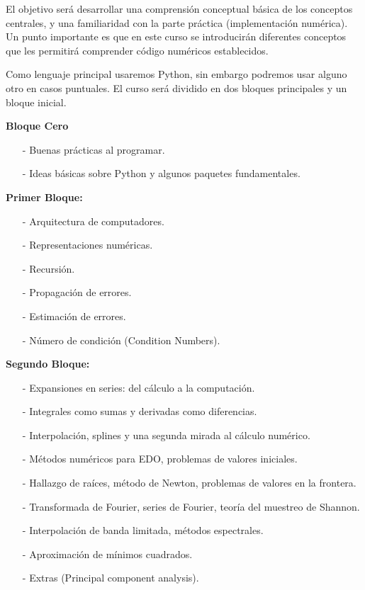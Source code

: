 \documentclass[12pt]{amsart} %
\begin{document}
\vspace{8pt}

El objetivo será desarrollar una comprensión conceptual básica de los conceptos centrales, y una familiaridad con la parte práctica (implementación numérica). Un punto importante es que en este curso se introducirán diferentes conceptos que les permitirá comprender código numéricos establecidos.

\vspace{8pt}
Como lenguaje principal usaremos Python, sin embargo podremos usar alguno otro en casos puntuales. El curso será dividido en dos bloques principales y un bloque inicial.

\vspace{8pt}

\textbf{Bloque Cero}
\begin{enumerate}
	\item[-] Buenas prácticas al programar.
	\item[-] Ideas básicas sobre Python y algunos paquetes fundamentales.
\end{enumerate}

\textbf{Primer Bloque:}
\begin{itemize}
	\item[-] Arquitectura de computadores.
	\item[-] Representaciones numéricas.
	\item[-] Recursión.
	\item[-] Propagación de errores.
	\item[-] Estimación de errores.
	\item[-] Número de condición  (Condition Numbers).
\end{itemize}

\textbf{Segundo Bloque:}
\begin{itemize}
	\item[-] Expansiones en series: del cálculo a la computación.
	\item[-] Integrales como sumas y derivadas como diferencias.
	\item[-] Interpolación, splines y una segunda mirada al cálculo numérico.
	\item[-] Métodos numéricos para EDO, problemas de valores iniciales.
	\item[-] Hallazgo de raíces, método de Newton, problemas de valores en la frontera.
	\item[-] Transformada de Fourier, series de Fourier, teoría del muestreo de Shannon.
	\item[-] Interpolación de banda limitada, métodos espectrales.
	\item[-] Aproximación de mínimos cuadrados.
	\item[-] Extras (Principal component analysis). 
\end{itemize}
\vspace{8pt}
\end{document}

